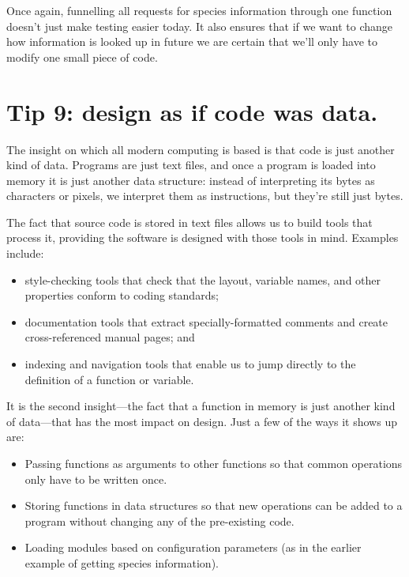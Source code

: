 \documentclass[10pt,letterpaper]{article}
\begin{document}
Once again,
funnelling all requests for species information through one function
doesn't just make testing easier today.
It also ensures that if we want to change how information is looked up in future
we are certain that we'll only have to modify one small piece of code.

\section*{Tip 9: design as if code was data.}

The insight on which all modern computing is based is that
code is just another kind of data.
Programs are just text files,
and once a program is loaded into memory it is just another data structure:
instead of interpreting its bytes as characters or pixels,
we interpret them as instructions,
but they're still just bytes.

The fact that source code is stored in text files
allows us to build tools that process it,
providing the software is designed with those tools in mind.
Examples include:

\begin{itemize}
\item
  style-checking tools that check that the layout, variable names, and other properties
  conform to coding standards;
\item
  documentation tools that extract specially-formatted comments
  and create cross-referenced manual pages; and
\item
  indexing and navigation tools that enable us to jump directly to
  the definition of a function or variable.
\end{itemize}

It is the second insight---the fact that
a function in memory is just another kind of data---that has the most impact on design.
Just a few of the ways it shows up are:

\begin{itemize}
\item
  Passing functions as arguments to other functions
  so that common operations only have to be written once.
\item
  Storing functions in data structures
  so that new operations can be added to a program
  without changing any of the pre-existing code.
\item
  Loading modules based on configuration parameters
  (as in the earlier example of getting species information).
\end{itemize}
\end{document}
